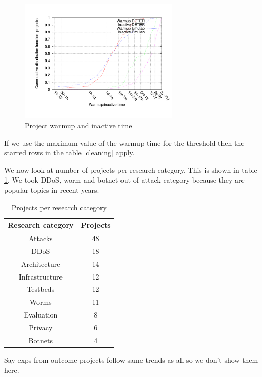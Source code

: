 \begin{figure}[htbp] \begin{center}
\includegraphics[width=3in]{figs/warmup_inact_proj.pdf} \caption{Project
warmup and inactive time} \label{warmupinpr} \end{center} \end{figure}

If we use the maximum value of the warmup time for the threshold then
the starred rows in the table \ref{cleaning} apply.

We now look at number of projects per research category. This is shown
in table \ref{projrc}. We took DDoS, worm and botnet out of attack
category because they are popular topics in recent years.

\begin{table}[htdp] \begin{center} \begin{tabular}{|c|c|} \hline
Research category & Projects \\\hline Attacks & 48  \\ DDoS & 18 \\
Architecture & 14\\ Infrastructure & 12 \\ Testbeds & 12 \\ Worms & 11
\\ Evaluation & 8 \\ Privacy & 6 \\ Botnets & 4 \\ \hline \end{tabular}
\end{center} \caption{Projects per research category} \label{projrc}
\end{table}%



Say exps from outcome projects follow same trends as all so we don't
show them here.

